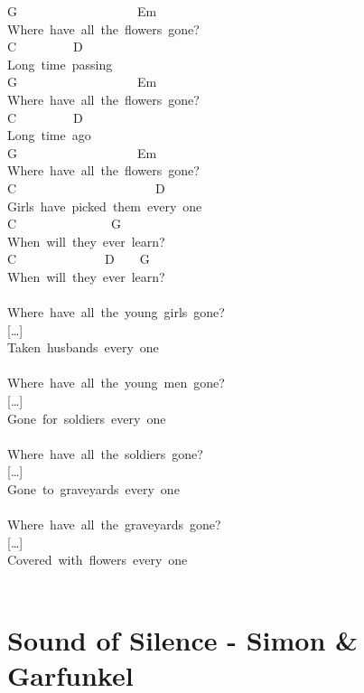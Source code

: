\documentclass[]{book}
\let\stdsection\section
\renewcommand\section{\clearpage\stdsection}
\begin{document}
G~~~~~~~~~~~~~~~~~~~Em\\
Where~have~all~the~flowers~gone?\\
C~~~~~~~~~D\\
Long~time~passing\\
G~~~~~~~~~~~~~~~~~~~Em\\
Where~have~all~the~flowers~gone?\\
C~~~~~~~~~D\\
Long~time~ago\\
G~~~~~~~~~~~~~~~~~~~Em\\
Where~have~all~the~flowers~gone?\\
C~~~~~~~~~~~~~~~~~~~~~~D\\
Girls~have~picked~them~every~one\\
C~~~~~~~~~~~~~~~G\\
When~will~they~ever~learn?\\
C~~~~~~~~~~~~~~D~~~~G\\
When~will~they~ever~learn?\\
~\\
Where~have~all~the~young~girls~gone?\\
{[}\ldots{]}\\
Taken~husbands~every~one\\
\hspace*{0.333em}\\
Where~have~all~the~young~men~gone?\\
{[}\ldots{]}\\
Gone~for~soldiers~every~one\\
~\\
Where~have~all~the~soldiers~gone?\\
{[}\ldots{]}\\
Gone~to~graveyards~every~one\\
~\\
Where~have~all~the~graveyards~gone?\\
{[}\ldots{]}\\
Covered~with~flowers~every~one\\
~\\

\hypertarget{sound-of-silence---simon-garfunkel}{%
\section{Sound of Silence - Simon \& Garfunkel}\label{sound-of-silence---simon-garfunkel}}
\end{document}

